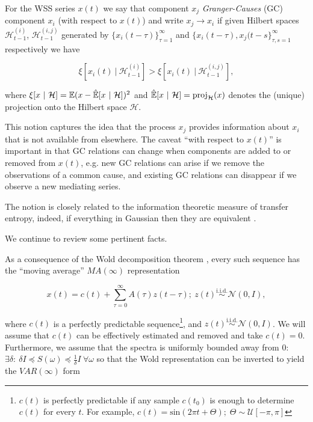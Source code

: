 \documentclass[12pt]{article}
\begin{document}
\begin{definition}
  For the WSS series $x(t)$ we say that component $x_j$ \textit{Granger-Causes} (GC) component $x_i$ (with respect to $x(t)$) and write $x_j \rightarrow x_i$ if given Hilbert spaces $\mathcal{H}^{(i)}_{t - 1}$, $\mathcal{H}^{(i, j)}_{t - 1}$ generated by $\{x_i(t - \tau)\}_{\tau = 1}^\infty$ and $\{x_i(t - \tau), x_j(t - s\}_{\tau, s = 1}^\infty$ respectively we have

\begin{equation}
  \xi[x_i(t) \ |\ \mathcal{H}^{(i)}_{t - 1}] > \xi[x_i(t) \ |\ \mathcal{H}^{(i, j)}_{t - 1}],
\end{equation}

where $\xi[x \ |\ \mathcal{H}] = \mathbb{E} (x - \hat{\mathbb{E}}[x \ |\ \mathcal{H}])^2$ and $\hat{\mathbb{E}}[x \ |\ \mathcal{H}] = \text{proj}_{\mathcal{H}}(x)$ denotes the (unique) projection onto the Hilbert space $\mathcal{H}$.
\end{definition}

This notion captures the idea that the process $x_j$ provides
information about $x_i$ that is not available from elsewhere.  The
caveat ``with respect to $x(t)$'' is important in that GC relations
can change when components are added to or removed from $x(t)$,
e.g. new GC relations can arise if we remove the observations of a
common cause, and existing GC relations can disappear if we observe a
new mediating series.

The notion is closely related to the information theoretic measure of
transfer entropy, indeed, if everything in Gaussian then they are
equivalent \cite{barnett2009granger}.

We continue to review some pertinent facts.

As a consequence of the Wold decomposition theorem \cite{lindquist},
every such sequence has the ``moving average'' $MA(\infty)$ representation

\begin{equation}
\label{eqn:wold}
  x(t) = c(t) + \sum_{\tau = 0}^\infty A(\tau) z(t - \tau);\ z(t) \overset{\text{i.i.d.}}{\sim} \mathcal{N}(0, I),
\end{equation}

where $c(t)$ is a perfectly predictable sequence\footnote{$c(t)$ is
  perfectly predictable if any sample $c(t_0)$ is enough to determine
  $c(t)$ for every $t$.  For example,
  $c(t) = \text{sin}(2\pi t + \Theta);\; \Theta \sim \mathcal{U}[-\pi, \pi]$}, and
$z(t) \overset{\text{i.i.d.}}{\sim} \mathcal{N}(0, I)$.  We will assume
that $c(t)$ can be effectively estimated and removed and take
$c(t) = 0$.  Furthermore, we assume that the spectra is uniformly
bounded away from $0$:
$\exists \delta:\ \delta I \preceq S(\omega) \preceq \frac{1}{\delta} I\ \forall \omega$ so that the Wold
representation can be inverted to yield the $VAR(\infty)$ form
\end{document}
